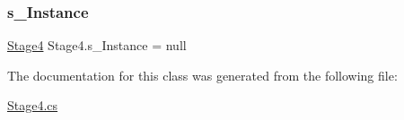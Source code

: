 \subsubsection{\texorpdfstring{s\+\_\+\+Instance}{s\_Instance}}
{\footnotesize\ttfamily \mbox{\hyperlink{class_stage4}{Stage4}} Stage4.\+s\+\_\+\+Instance = null\hspace{0.3cm}{\ttfamily [static]}}



The documentation for this class was generated from the following file\+:\begin{DoxyCompactItemize}
\item 
\mbox{\hyperlink{_stage4_8cs}{Stage4.\+cs}}\end{DoxyCompactItemize}
